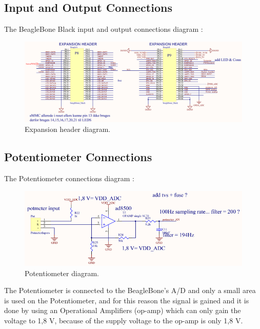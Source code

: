 \subsection{Input and Output Connections}
The BeagleBone Black input and output connections diagram :\\
\begin{figure}[H]
  \centering
	\includegraphics[scale=0.92]{figures/ExpanionHeader.pdf}
	\caption{Expansion header diagram.}
	\label{labExpanionHeader}
\end{figure}\vspace{-5mm}

\subsection{Potentiometer Connections}
The Potentiometer connections diagram :\\

\begin{figure}[H]
	\centering
	\includegraphics[scale=0.92]{figures/Potmeter.pdf}
	\caption{Potentiometer diagram.}
	\label{labPotmeter}
\end{figure}\vspace{-5mm}

The Potentiometer is connected to the BeagleBone’s A/D and only a small area is used on the Potentiometer, and for this reason the signal is gained and it is done by using an Operational Amplifiers (op-amp) which can only gain the voltage to 1,8 V, because of the supply voltage to the op-amp is only 1,8 V.

